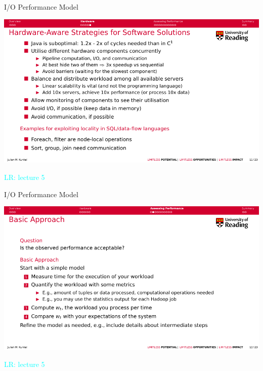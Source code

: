 \documentclass[compress,11pt,xcolor=svgnames,aspectratio=169]{beamer}
\newcommand{\lr}[1]{\textcolor{cyan}{LR: #1}}
\begin{document}
\begin{frame}[t]{I/O Performance Model}

\begin{center}
\includegraphics[scale=0.7]{fig/5-4}
\end{center}

\lr{lecture 5}

\end{frame}

\begin{frame}[t]{I/O Performance Model}

\begin{center}
\includegraphics[scale=0.7]{fig/5-5}
\end{center}

\lr{lecture 5}

\end{frame}
\end{document}
